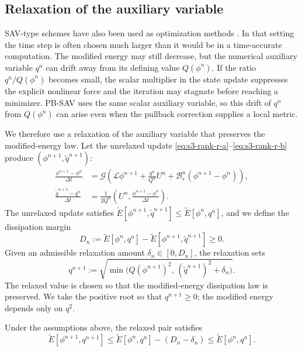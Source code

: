 \documentclass[10pt,onefignum,onetabnum,hidelinks]{siamart251216}
\begin{document}
\subsection{Relaxation of the auxiliary variable}
\label{subsec:q2-relaxation}

SAV-type schemes have also been used as optimization methods \cite{liu2023efficient,zhang2025relaxed}.  In that setting the time step is often chosen much larger than it would be in a time-accurate computation.  The modified energy may still decrease, but the numerical auxiliary variable $q^n$ can drift away from its defining value $Q(\phi^n)$.  If the ratio $q^n/Q(\phi^n)$ becomes small, the scalar multiplier in the state update suppresses the explicit nonlinear force and the iteration may stagnate before reaching a minimizer.  PB-SAV uses the same scalar auxiliary variable, so this drift of $q^n$ from $Q(\phi^n)$ can arise even when the pullback correction supplies a local metric.

We therefore use a relaxation of the auxiliary variable that preserves the modified-energy law. Let the unrelaxed update \eqref{eq:s3-rank-r-a}--\eqref{eq:s3-rank-r-b} produce $(\phi^{n+1},\widetilde q^{n+1})$:
\begin{align}
\frac{\phi^{n+1}-\phi^n}{\Delta t}
&=
\mathcal G\left(
\mathcal L\phi^{n+1}
+
\frac{q^n}{Q^n}U^n
+
\mathcal B_r^n(\phi^{n+1}-\phi^n)
\right),
\label{eq:s4-unrelaxed-rank-r-a}
\\
\frac{\widetilde q^{n+1}-q^n}{\Delta t}
&=
\frac{1}{2Q^n}
\left(
U^n,\frac{\phi^{n+1}-\phi^n}{\Delta t}
\right).
\label{eq:s4-unrelaxed-rank-r-b}
\end{align}
The unrelaxed update satisfies $\widetilde E[\phi^{n+1},\widetilde q^{n+1}]\le\widetilde E[\phi^n,q^n]$, and we define the dissipation margin
\[
D_n
:=
\widetilde E[\phi^n,q^n]-\widetilde E[\phi^{n+1},\widetilde q^{n+1}]\ge0.
\]
Given an admissible relaxation amount $\delta_n\in[0,D_n]$, the relaxation sets
\begin{equation}
q^{n+1}
:=
\sqrt{\min\bigl(Q(\phi^{n+1})^2,\,(\widetilde q^{n+1})^2+\delta_n\bigr)}.
\label{eq:s4-energy-admissible-relaxation}
\end{equation}
The relaxed value is chosen so that the modified-energy dissipation law is preserved. We take the positive root so that $q^{n+1}\ge0$; the modified energy depends only on $q^2$.

\begin{proposition}
\label{lem:q2-relaxation-energy}
Under the assumptions above, the relaxed pair satisfies
\begin{equation}
\widetilde E[\phi^{n+1},q^{n+1}]
\le
\widetilde E[\phi^n,q^n]-(D_n-\delta_n)
\le
\widetilde E[\phi^n,q^n].
\label{eq:s4-energy-admissible-relaxation-law}
\end{equation}
\end{proposition}
\end{document}
